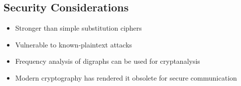 \documentclass[12pt,a4paper]{article}
\begin{document}


\subsection*{Security Considerations}
\begin{itemize}
    \item Stronger than simple substitution ciphers
    \item Vulnerable to known-plaintext attacks
    \item Frequency analysis of digraphs can be used for cryptanalysis
    \item Modern cryptography has rendered it obsolete for secure communication
\end{itemize}





\end{document}
